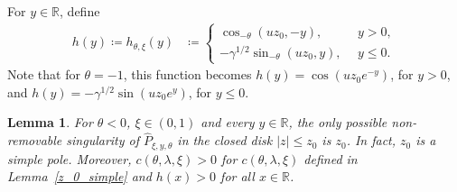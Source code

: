 \documentclass[12pt]{article}
\newcommand{\R}{\mathbb{R}} %
\newcommand{\1}{\mathds{1}}
\theoremstyle{definition}
\theoremstyle{plain}
\newtheorem{Lemma}[definition]{Lemma}
\theoremstyle{remark}
\begin{document}
For $y\in\R$, define
\begin{align}\label{def_eigenfunction_neg_theta}
    h(y)\coloneqq h_{\theta,\xi}(y)&\coloneqq
   \begin{cases}
       \cos_{-\theta}\left(u z_0,-y\right) ,~~&y>0,
        \\-\gamma^{1/2}\sin_{-\theta}\left(u z_0,y\right),~~&y\le 0.
    \end{cases}
\end{align}
Note that for $\theta=-1$, this function becomes $h(y)=\cos\left(u z_0e^{-y}\right)$, for $y>0$, and $h(y)=-\gamma^{1/2}\sin\left(u z_0e^y\right)$, for $y\le 0$.

\begin{Lemma}\label{h_pos_thetale-1}
     For $\theta<0$, $\xi\in(0,1)$ and every $y\in\R$, the only possible non-removable
singularity of $\hat P_{\xi,y,\theta}$ in the closed disk
$|z|\le z_0$ is $z_0$. In fact, $z_0$ is a simple pole. Moreover, $c(\theta,\lambda,\xi)>0$ for $c(\theta,\lambda,\xi)$ defined in Lemma~\ref{z_0_simple} and $h(x)>0$ for all $x\in\R$. 
\end{Lemma}
\end{document}
